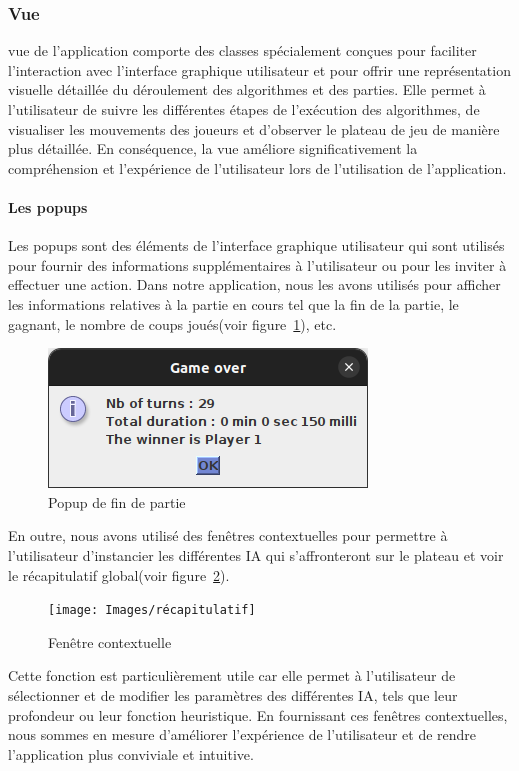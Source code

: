 \subsubsection{Vue}
vue de l'application comporte des classes spécialement conçues pour faciliter l'interaction avec l'interface graphique 
utilisateur et pour offrir une représentation visuelle détaillée du déroulement des algorithmes et des parties. Elle permet à l'utilisateur de 
suivre les différentes étapes de l'exécution des algorithmes, de visualiser les mouvements des joueurs et d'observer le plateau de jeu de manière plus détaillée. 
En conséquence, la vue améliore significativement la compréhension et l'expérience de l'utilisateur lors de l'utilisation de l'application.

\tocless\paragraph{Les popups}
Les popups sont des éléments de l'interface graphique utilisateur qui sont utilisés pour fournir des informations supplémentaires à l'utilisateur ou 
pour les inviter à effectuer une action. Dans notre application, nous les avons utilisés pour afficher les informations relatives à la partie en cours tel que 
la fin de la partie, le gagnant, le nombre de coups joués(voir figure~\ref{fig:popupendgame}), etc.\\

\begin{figure}[H]
	\centering
	\includegraphics[scale=0.4]{Images/finjeu}
	\caption{Popup de fin de partie}
	\label{fig:popupendgame}
\end{figure}

En outre,  nous avons utilisé des fenêtres contextuelles pour permettre à l'utilisateur d'instancier les différentes IA qui s'affronteront sur le plateau et voir le récapitulatif global(voir figure~\ref{fig:fenetrecontextuelle}).
\begin{figure}[H]
	\centering
	\texttt{[image: Images/récapitulatif]}
	\caption{Fenêtre contextuelle}
	\label{fig:fenetrecontextuelle}
\end{figure}
Cette fonction est particulièrement utile car elle permet à l'utilisateur de sélectionner et de modifier les paramètres des différentes IA, tels que leur profondeur 
ou leur fonction heuristique. En fournissant ces fenêtres contextuelles, nous sommes en mesure d'améliorer l'expérience de l'utilisateur et de rendre l'application plus conviviale et intuitive.

